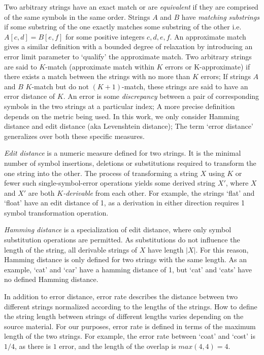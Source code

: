 Two arbitrary strings have an \gls{exact match} or are \textit{equivalent} if they are comprised of the same symbols in the same order. Strings $A$ and $B$ have \textit{matching substrings} if some substring of the one exactly matches some substring of the other i.e. $A[c,d] = B[e,f]$ for some positive integers $c,d,e,f$. An \gls{approximate match} gives a similar definition with a bounded degree of relaxation by introducing an \gls{error} limit parameter  to `qualify' the approximate match. Two arbitrary strings are said to $K$-match (approximate match within $K$ errors or \gls{K-approximate}) if there exists a match between the strings with no more than $K$ errors; If strings $A$ and $B$ $K$-match but do not $(K+1)$-match, these strings are said to have an \gls{error distance} of $K$. An error is some  \textit{discrepancy} between a pair of corresponding symbols in the two strings at a particular index; A more precise definition depends on the metric being used. In this work, we only consider \gls{Hamming distance} and \gls{edit distance} (aka Levenshtein distance); The term `\gls{error distance}' generalizes over both these specific measures.

\textit{Edit distance} is a numeric measure defined for two strings. It is the minimal number of symbol \glspl{insertion}, \glspl{deletion} or \glspl{substitution} required to transform the one string into the other. The process of transforming a string $X$ using $K$ or fewer such single-symbol-error operations yields some \gls{derived string} $X'$, where $X$ and $X'$ are both \textit{$K$-derivable} from each other. For example, the strings `flat' and `float' have an edit distance of 1, as a derivation in either direction requires 1 symbol transformation operation.
 
\textit{Hamming distance} is a specialization of edit distance, where only symbol substitution operations are permitted. As substitutions do not influence the length of the string, all derivable strings of $X$ have length $|X|$. For this reason, Hamming distance is only defined for two strings with the same length. As an example, `cat' and `car' have a hamming distance of 1,  but `cat' and `cats' have no defined Hamming distance.

In addition to error distance, \gls{error rate} describes the distance between two different strings normalized according to the lengths of the strings. How to define the string length between strings of different lengths varies depending on the source material. For our purposes, error rate is defined in terms of the maximum length of the two strings. For example, the error rate between `coat' and `cost' is $1/4$, as there is $1$ error, and the length of the overlap is $max(4, 4) = 4$.

